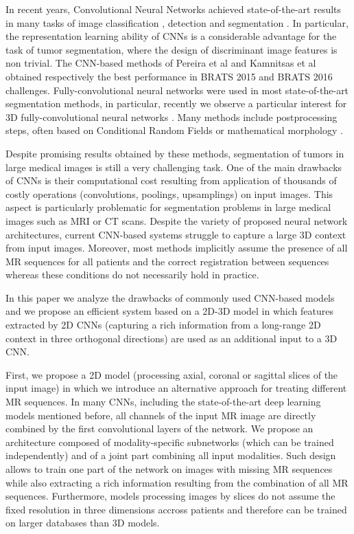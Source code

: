 \documentclass[preprint,12pt]{elsarticle}
\begin{document}
In recent years, Convolutional Neural Networks \cite{lecun1995convolutional} achieved state-of-the-art results in many tasks of image classification \cite{he2016deep, krizhevsky2012imagenet, simonyan2014very}, detection \cite{sermanet2013overfeat} and segmentation \cite{long2015fully,chen2014semantic}. In particular, the representation learning ability of CNNs is a considerable advantage for the task of tumor segmentation, where the design of discriminant image features is non trivial. The CNN-based methods of Pereira et al \cite{pereira2015deep} and Kamnitsas et al \cite{kamnitsas2016efficient} obtained respectively the best performance in BRATS 2015 and BRATS 2016 challenges. Fully-convolutional neural networks \cite{long2015fully,ronneberger2015u,havaei2017brain,zheng20183d} were used in most state-of-the-art segmentation methods, in particular, recently we observe a particular interest for 3D fully-convolutional neural networks \cite{dou20173d,cciccek20163d, kamnitsas2017ensembles, wang2017automatic,isensee2017brain}. Many methods include postprocessing steps, often based on Conditional Random Fields \cite{lafferty2001conditional} or mathematical morphology \cite{serra2012mathematical}.

Despite promising results obtained by these methods, segmentation of tumors in large medical images is still a very challenging task. One of the main drawbacks of CNNs is their computational cost resulting from application of thousands of costly operations (convolutions, poolings, upsamplings) on input images. This aspect is particularly problematic for segmentation problems in large medical images such as MRI or CT scans. Despite the variety of proposed neural network architectures, current CNN-based systems struggle to capture a large 3D context from input images. Moreover, most methods implicitly assume the presence of all MR sequences for all patients and the correct registration between sequences whereas these conditions do not necessarily hold in practice. 

In this paper we analyze the drawbacks of commonly used CNN-based models and we propose an efficient system based on a 2D-3D model in which features extracted by 2D CNNs (capturing a rich information from a long-range 2D context in three orthogonal directions) are used as an additional input to a 3D CNN.

First, we propose a 2D model (processing axial, coronal or sagittal slices of the input image) in which we introduce an alternative approach for treating different MR sequences. In many CNNs, including the state-of-the-art deep learning models mentioned before, all channels of the input MR image are directly combined by the first convolutional layers of the network. We propose an architecture composed of modality-specific subnetworks (which can be trained independently) and of a joint part combining all input modalities. Such design allows to train one part of the network on images with missing MR sequences while also extracting a rich information resulting from the combination of all MR sequences. Furthermore, models processing images by slices do not assume the fixed resolution in three dimensions accross patients and therefore can be trained on larger databases than 3D models.
\end{document}
